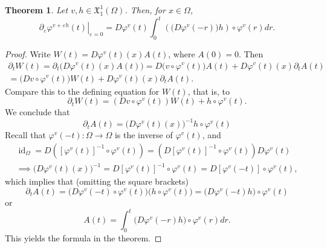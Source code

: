 \documentclass[a5paper,10pt,twoside]{article}
\newcommand{\X}{\ensuremath{\mathfrak{X}}}
\DeclareMathOperator*{\id}{id}
\theoremstyle{plain}
\newtheorem{teo}{Theorem}[section]
\theoremstyle{definition}
\theoremstyle{remark}
\begin{document}
\begin{teo}
	Let $v,h\in \X_1^1(\Omega)$. Then, for $x\in\Omega$,
	\[
	\left.\partial_\varepsilon\varphi^{v+\varepsilon h}(t)\right|_{\varepsilon=0}=D\varphi^v(t)\int_0^t\left(\big(D\varphi^v(-r)\big)h\right)\circ \varphi^v(r) dr.
	\]
\end{teo}

\begin{proof}
	Write $W(t)=D\varphi^v(t)(x)A(t)$, where $A(0)=0$. Then
	\begin{multline*}
	\partial_tW(t)=\partial_t\big(D\varphi^v(t)(x)A(t)\big)=D\big(v\circ \varphi^v(t)\big)A(t)+D\varphi^v(t)(x)\partial_tA(t)\\
	=\big(Dv\circ \varphi^v(t)\big)W(t)+D\varphi^v(t)(x)\partial_tA(t).
	\end{multline*}
	Compare this to the defining equation for $W(t)$, that is, to
	\[
	\partial_t W(t)=\left(Dv\circ \varphi^v(t)\right)W(t)+h\circ \varphi^v(t).
	\]
	We conclude that
	\[
	\partial_tA(t)=\big(D\varphi^v(t)(x)\big)^{-1}h\circ \varphi^v(t)
	\]
	Recall that $\varphi^v(-t):\Omega\to\Omega$ is the inverse of $\varphi^v(t)$, and
	\begin{multline*}
	\id_\Omega=D\left([\varphi^v(t)]^{-1}\circ\varphi^v(t)\right)=\left(D[\varphi^v(t)]^{-1}\circ \varphi^v(t)\right)D\varphi^v(t) \\
	\implies \big(D\varphi^v(t)(x)\big)^{-1}=D[\varphi^v(t)]^{-1}\circ \varphi^v(t)=D[\varphi^v(-t)]\circ \varphi^v(t),
	\end{multline*}
	which implies that (omitting the square brackets)
	\[
	\partial_tA(t)=\big(D\varphi^v(-t)\circ \varphi^v(t)\big)\big(h\circ  \varphi^v(t)\big)=\big(D\varphi^v(-t)h\big)\circ \varphi^v(t)
	\]
	or
	\[
	A(t)=\int_0^t\big(D\varphi^v(-r)h\big)\circ \varphi^v(r) dr.
	\]
	This yields the formula in the theorem.
\end{proof}
\end{document}
